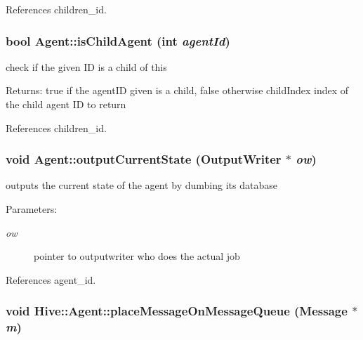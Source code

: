 References children\_\-id.
\subsubsection[isChildAgent]{\setlength{\rightskip}{0pt plus 5cm}bool Agent::isChildAgent (int {\em agentId})}\label{classHive_1_1Agent_d9f2480125d9382dbde4b59cbeeb2f5b}


check if the given ID is a child of this \begin{Desc}
\item[Returns:]true if the agentID given is a child, false otherwise childIndex index of the child agent ID to return \end{Desc}


References children\_\-id.
\subsubsection[outputCurrentState]{\setlength{\rightskip}{0pt plus 5cm}void Agent::outputCurrentState ({\bf OutputWriter} $\ast$ {\em ow})}\label{classHive_1_1Agent_6904cc83add9827300b9830e45239abc}


outputs the current state of the agent by dumbing its database \begin{Desc}
\item[Parameters:]
\begin{description}
\item[{\em ow}]pointer to outputwriter who does the actual job \end{description}
\end{Desc}


References agent\_\-id.
\subsubsection[placeMessageOnMessageQueue]{\setlength{\rightskip}{0pt plus 5cm}void Hive::Agent::placeMessageOnMessageQueue ({\bf Message} $\ast$ {\em m})\hspace{0.3cm}{\tt  [inline]}}\label{classHive_1_1Agent_8d977f6dd7877a04da48c9325e89fada}




